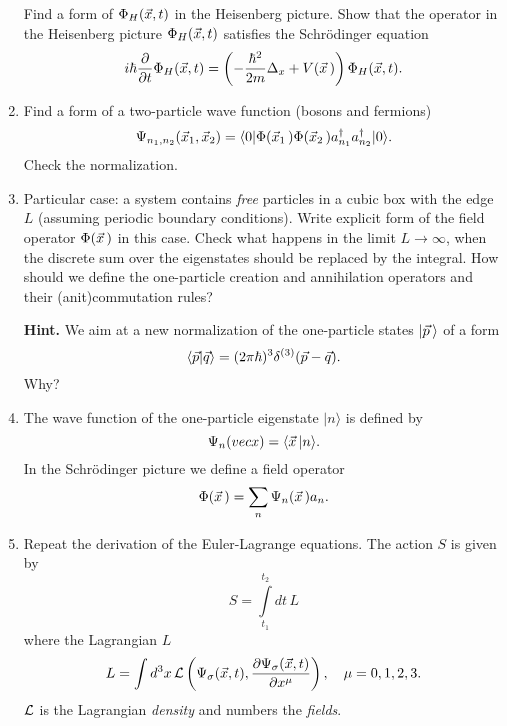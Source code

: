 \documentclass[a4paper,11pt]{article}
\begin{document}
\begin{enumerate}
  Find a form of $\Phi_{ H }( \vec{ x }, t )$ in the Heisenberg picture.
  Show that the operator in the Heisenberg picture $\Phi_{ H }( \vec{ x }, t )$ satisfies the Schr\"{o}dinger equation
  \begin{equation}
    \label{eq:26}
    i \hbar \frac{ \partial }{ \partial t } \Phi_{ H }( \vec{ x }, t )
    =
    \left( -\frac{ \hbar^{ 2 } }{ 2m } \Delta_{ x } + V( \vec{ x } \, ) \right)
    \Phi_{ H }( \vec{ x }, t ).
  \end{equation}

\item Find a form of a two-particle wave function (bosons and fermions)
  \begin{equation}
    \label{eq:27}
    \Psi_{ n_{ 1 }, n_{ 2 } }( \vec{ x }_{ 1 }, \vec{ x }_{ 2 } ) =
    \langle 0 | \Phi( \vec{ x }_{ 1 } \, ) \Phi( \vec{ x }_{ 2 } \, )
    a_{ n_{ 1 } }^{ \dagger } a_{ n_{ 2 } }^{ \dagger } | 0 \rangle.
  \end{equation}
  Check the normalization.

\item Particular case: a system contains \textit{free} particles in a cubic box with the edge $L$ (assuming periodic boundary conditions). Write explicit form of the field operator $\Phi( \vec{ x } \, )$ in this case. Check what happens in the limit $L \to \infty$, when the discrete sum over the eigenstates should be replaced by the integral. How should we define the one-particle creation and annihilation operators and their (anit)commutation rules?

  \textbf{Hint.} We aim at a new normalization of the one-particle states $| \vec{ p } \, \rangle$ of a form
  \begin{equation}
    \label{eq:28}
    \langle \vec{ p } | \vec{ q } \rangle = ( 2\pi \hbar )^{ 3 } \delta^{ ( 3 ) }( \vec{ p } - \vec{ q } ).
  \end{equation}
  Why?

\item The wave function of the one-particle eigenstate $| n \rangle$ is defined by
  \begin{equation}
    \label{eq:20}
    \Psi_{ n }( vecx ) = \langle \vec{ x } \, | n \rangle.
  \end{equation}
  In the Schr\"{o}dinger picture we define a field operator
  \begin{equation}
    \label{eq:21}
    \Phi( \vec{ x } \, ) = \sum_{ n } \Psi_{ n }( \vec{ x } \, ) a_{ n }.
  \end{equation}

\item Repeat the derivation of the Euler-Lagrange equations. The
  action $S$ is given by
  \begin{equation}
    \label{eq:QM32}
    S = \int\limits_{ t_{ 1 } }^{ t_{ 2 } } dt \, L
  \end{equation}
  where the Lagrangian $L$
  \begin{equation}
    \label{eq:QM33}
    L =
    \int d^{ 3 } x \, \mathcal{L}\left( \Psi_{ \sigma }( \vec{ x }, t ),
      \frac{ \partial \Psi_{ \sigma }( \vec{ x }, t ) }{ \partial x^{ \mu } } \right), \quad
    \mu = 0, 1, 2, 3.
  \end{equation}
  $\mathcal{L}$ is the Lagrangian \textit{density} and numbers the
  \textit{fields}.


\end{enumerate}
\end{document}
